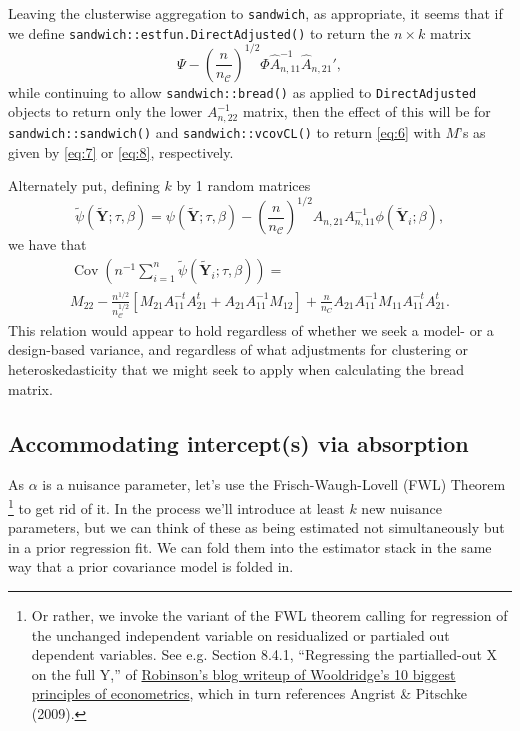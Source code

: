\documentclass{article}
\begin{document}
Leaving the clusterwise aggregation to \texttt{sandwich}, as
appropriate, it seems that if we define
\texttt{sandwich::estfun.DirectAdjusted()} to return the $n \times k$ matrix
\begin{equation*}
  \Psi -
  \left(\frac{n}{n_{\mathcal{C}}}\right)^{1/2}\Phi
  \hat{A}_{n,11}^{-1}\hat{A}_{n,21}', 
\end{equation*}
while continuing to allow \texttt{sandwich::bread()} as applied to
\texttt{DirectAdjusted} objects to return only
the lower $A_{n,22}^{-1}$ matrix, then the effect of this will be for \texttt{sandwich::sandwich()}
and \texttt{sandwich::vcovCL()} to return \eqref{eq:6} with $M$'s as
given by \eqref{eq:7} or \eqref{eq:8}, respectively.

Alternately put,
defining $k$ by 1 random matrices 
\begin{equation}\label{eq:10}
    \tilde{\psi}(\tilde{\mathbf{Y}}; \tau,
    \beta) = \psi (\tilde{\mathbf{Y}}; \tau,
    \beta) -
    \left(\frac{n}{n_{\mathcal{C}}}\right)^{1/2}
    A_{n,21} A_{n,11}^{-1}\phi(\tilde{\mathbf{Y}}_{i};
    \beta), 
\end{equation}
we have that
\begin{multline*}
  \operatorname{Cov}\left(n^{-1}\sum_{i=1}^{n} \tilde{\psi}(\tilde{\mathbf{Y}}_{i}; \tau,
    \beta)\right) = \\
  M_{22} -
                                 \frac{n^{1/2}}{n_{\mathcal{C}}^{1/2}}[M_{21}A_{11}^{-t}A_{21}^t
                                 + A_{21}A_{11}^{-1}M_{12}] +
                                 \frac{n}{n_C}A_{21}A_{11}^{-1}M_{11}A_{11}^{-t}A_{21}^{t}
                                .
                               \end{multline*}
This relation would appear to hold regardless of whether we seek a model- or a
design-based variance, and regardless of what adjustments for
clustering or heteroskedasticity that we might seek to apply when
calculating the bread matrix. 


\subsection{Accommodating intercept(s) via absorption}\label{sec:accomm-interc-via}
As $\alpha$ is a nuisance parameter, let's use the
Frisch-Waugh-Lovell (FWL) Theorem%
\footnote{Or rather, we invoke the variant of the FWL theorem calling
  for regression of the unchanged independent variable on residualized
or partialed out dependent variables.  See e.g. Section 8.4.1,
``Regressing the partialled-out X on the full Y,'' of
\href{https://bookdown.org/ts_robinson1994/10_fundamental_theorems_for_econometrics/frisch.html}{Robinson's
  blog writeup of Wooldridge's 10 biggest principles of econometrics},
which in turn references Angrist \& Pitschke (2009).} to get rid of it.  In the process we'll
introduce at least $k$ new nuisance parameters, but we can think of these as
being estimated not simultaneously but in a prior regression fit.
We can fold them into the estimator stack in the same way that a prior
covariance model is folded in.
\end{document}
